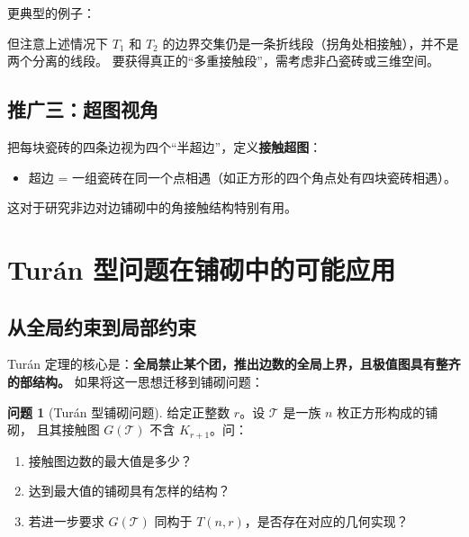 \documentclass[12pt,a4paper]{article}
\theoremstyle{plain}
\theoremstyle{definition}
\newtheorem{problem}[theorem]{问题}
\theoremstyle{remark}
\begin{document}
更典型的例子：

\begin{center}
\end{center}

但注意上述情况下 $T_1$ 和 $T_2$ 的边界交集仍是一条折线段（拐角处相接触），并不是两个分离的线段。
要获得真正的``多重接触段''，需考虑非凸瓷砖或三维空间。

\subsection{推广三：超图视角}

把每块瓷砖的四条边视为四个``半超边''，定义\textbf{接触超图}：
\begin{itemize}
    \item 超边 = 一组瓷砖在同一个点相遇（如正方形的四个角点处有四块瓷砖相遇）。
\end{itemize}
这对于研究非边对边铺砌中的角接触结构特别有用。

\section{Turán 型问题在铺砌中的可能应用}

\subsection{从全局约束到局部约束}

Turán 定理的核心是：\textbf{全局禁止某个团，推出边数的全局上界，且极值图具有整齐的部结构。}
如果将这一思想迁移到铺砌问题：

\begin{problem}[Turán 型铺砌问题]
给定正整数 $r$。设 $\mathcal{T}$ 是一族 $n$ 枚正方形构成的铺砌，
且其接触图 $G(\mathcal{T})$ 不含 $K_{r+1}$。问：
\begin{enumerate}[label=(\alph*)]
    \item 接触图边数的最大值是多少？
    \item 达到最大值的铺砌具有怎样的结构？
    \item 若进一步要求 $G(\mathcal{T})$ 同构于 $T(n,r)$，是否存在对应的几何实现？
\end{enumerate}
\end{problem}
\end{document}
